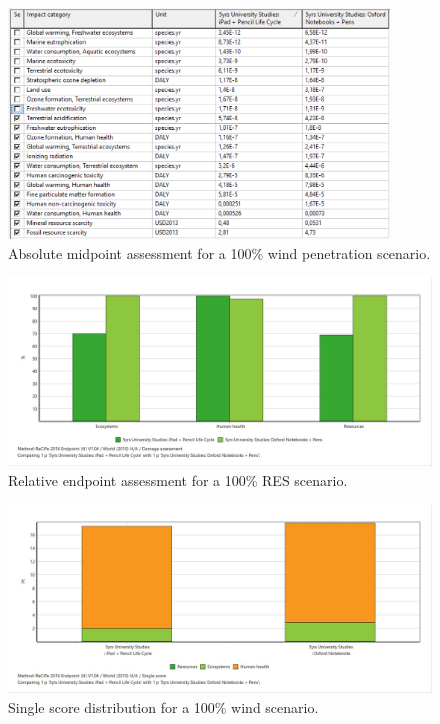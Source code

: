 \begin{figure}[H]
    \centering
    \includegraphics[width=0.9\textwidth]{images/wind/Wind_midpoint_absolute.png}
    \caption{Absolute midpoint assessment for a 100\% wind penetration scenario.}\label{fig:characterization_table_wind_100}
\end{figure}

\begin{figure}[H]
    \centering
    \includegraphics[width=\textwidth]{images/wind/Wind_endpoint_relative.JPG}
    \caption{Relative endpoint assessment for a 100\% RES scenario.}\label{fig:damage_assessment_wind_100}
\end{figure}

\begin{figure}[H]
    \centering
    \includegraphics[width=\textwidth]{images/wind/Wind_singlescore.JPG}
    \caption{Single score distribution for a 100\% wind scenario.}\label{fig:single_score_RESwind}
\end{figure}


